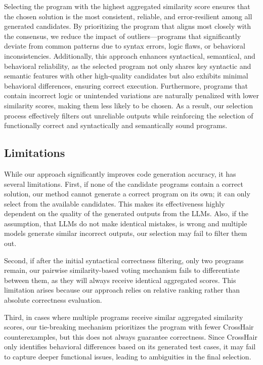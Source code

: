 \documentclass{article}
\begin{document}
Selecting the program with the highest aggregated similarity score ensures that the chosen solution is the most consistent, reliable, and error-resilient among all generated candidates. By prioritizing the program that aligns most closely with the consensus, we reduce the impact of outliers—programs that significantly deviate from common patterns due to syntax errors, logic flaws, or behavioral inconsistencies. Additionally, this approach enhances syntactical, semantical, and behavioral reliability, as the selected program not only shares key syntactic and semantic features with other high-quality candidates but also exhibits minimal behavioral differences, ensuring correct execution. Furthermore, programs that contain incorrect logic or unintended variations are naturally penalized with lower similarity scores, making them less likely to be chosen. As a result, our selection process effectively filters out unreliable outputs while reinforcing the selection of functionally correct and syntactically and semantically sound programs.

\subsection{Limitations}

While our approach significantly improves code generation accuracy, it has several limitations. First, if none of the candidate programs contain a correct solution, our method cannot generate a correct program on its own; it can only select from the available candidates. This makes its effectiveness highly dependent on the quality of the generated outputs from the LLMs. Also, if the assumption, that LLMs do not make identical mistakes, is wrong and multiple models generate similar incorrect outputs, our selection may fail to filter them out.

Second, if after the initial syntactical correctness filtering, only two programs remain, our pairwise similarity-based voting mechanism fails to differentiate between them, as they will always receive identical aggregated scores. This limitation arises because our approach relies on relative ranking rather than absolute correctness evaluation. 

Third, in cases where multiple programs receive similar aggregated similarity scores, our tie-breaking mechanism prioritizes the program with fewer CrossHair counterexamples, but this does not always guarantee correctness. Since CrossHair only identifies behavioral differences based on its generated test cases, it may fail to capture deeper functional issues, leading to ambiguities in the final selection. 
\end{document}

